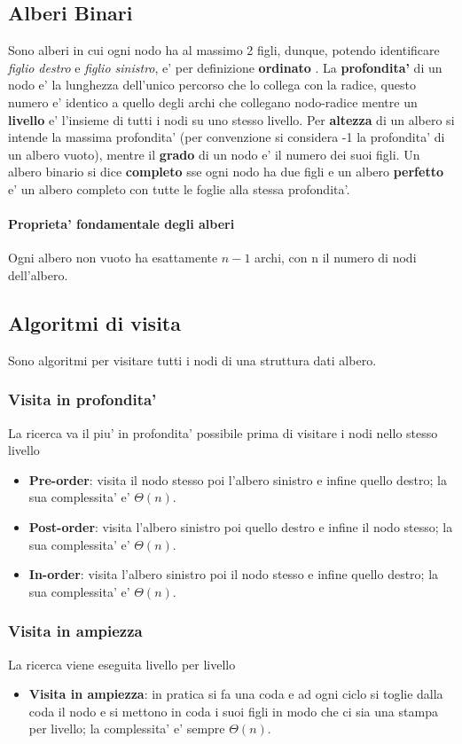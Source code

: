 \documentclass{article}
\begin{document}
\subsection{Alberi Binari}
Sono alberi in cui ogni nodo ha al massimo 2 figli, dunque, potendo identificare \textit{figlio destro} e \textit{figlio sinistro}, e' per definizione \textbf{ordinato} .
La \textbf{profondita'} di un nodo e' la lunghezza dell'unico percorso che lo collega con la radice, 
questo numero e' identico a quello degli archi che collegano nodo-radice mentre un \textbf{livello} e' l'insieme di tutti i nodi su uno stesso livello. 
Per \textbf{altezza} di un albero si intende la massima profondita' (per convenzione si considera -1 la profondita' di un albero vuoto), mentre il \textbf{grado} di un nodo e' il numero dei suoi figli.
Un albero binario si dice \textbf{completo} sse ogni nodo ha due figli e un albero \textbf{perfetto} e' un albero completo con tutte le foglie alla stessa profondita'.
\paragraph{Proprieta' fondamentale degli alberi} Ogni albero non vuoto ha esattamente $n - 1$ archi, con n il numero di nodi dell'albero.
\subsection{Algoritmi di visita}
Sono algoritmi per visitare tutti i nodi di una struttura dati albero.
\subsubsection{Visita in profondita'}
La ricerca va il piu' in profondita' possibile prima di visitare i nodi nello stesso livello
\begin{itemize}
    \item \textbf{Pre-order}: visita il nodo stesso poi l'albero sinistro e infine quello destro; la sua complessita' e' $\Theta(n).$
    \item \textbf{Post-order}: visita l'albero sinistro poi quello destro e infine il nodo stesso; la sua complessita' e' $\Theta(n).$
    \item \textbf{In-order}: visita l'albero sinistro poi il nodo stesso e infine quello destro; la sua complessita' e' $\Theta(n).$
\end{itemize}
\subsubsection{Visita in ampiezza}
La ricerca viene eseguita livello per livello
\begin{itemize}
    \item \textbf{Visita in ampiezza}: in pratica si fa una coda e ad ogni ciclo si toglie dalla coda il nodo e si mettono in coda i suoi figli in modo che ci sia una stampa per livello; la complessita' e' sempre $\Theta(n).$
\end{itemize}
\end{document}
